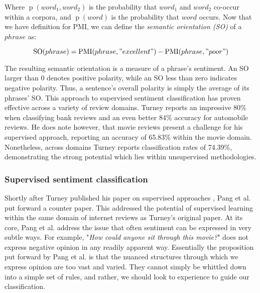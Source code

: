 Where $\operatorname{p}(word_1,word_2)$ is the probability that $word_1$ and $word_2$ co-occur within a corpora, and $\operatorname{p}(word)$ is the probability that $word$ occurs. Now that we have definition for PMI, we can define the \emph{semantic orientation (SO)} of a $phrase$ as:

\begin{equation}
	\operatorname{SO}(phrase) = \operatorname{PMI}(phrase, "excellent") - \operatorname{PMI}(phrase, "poor")
\end{equation}

The resulting semantic orientation is a measure of a phrase's sentiment. An SO larger than 0 denotes positive polarity, while an SO less than zero indicates negative polarity. Thus, a sentence's overall polarity is simply the average of its phrases' SO. This approach to supervised sentiment classification has proven effective across a variety of review domains. Turney reports an impressive 80\% when classifying bank reviews and an even better 84\% accuracy for automobile reviews. He does note however, that movie reviews present a challenge for his supervised approach, reporting an accuracy of 65.83\% within the movie domain. Nonetheless, across domains Turney reports classification rates of 74.39\%, demonstrating the strong potential which lies within unsupervised methodologies.

\subsubsection{Supervised sentiment classification}

Shortly after Turney published his paper on supervised approaches \cite{Turney:2002vv}, Pang et al. put forward a counter paper. This addressed the potential of supervised learning within the same domain of internet reviews as Turney's original paper. At its core, Pang et al. address the issue that often sentiment can be expressed in very subtle ways. For example, "\emph{How could anyone sit through this movie?}" does not express negative opinion in any readily apparent way. Essentially the proposition put forward by Pang et al. is that the nuanced structures through which we express opinion are too vast and varied. They cannot simply be whittled down into a simple set of rules, and rather, we should look to experience to guide our classification.

